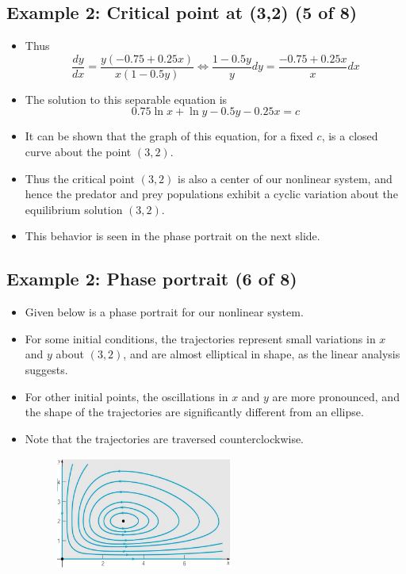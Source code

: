\documentclass[11pt,a4paper]{article}
\begin{document}
	\subsection*{Example 2: Critical point at (3,2) (5 of 8)}
	\begin{itemize}
		\item Thus
		$$
		\frac{dy}{dx} = \frac{y(-0.75 + 0.25x)}{x(1-0.5y)} \Leftrightarrow \frac{1-0.5y}{y}dy = \frac{-0.75 + 0.25x}{x}dx
		$$
		\item The solution to this separable equation is
		$$
		0.75\ln x + \ln y - 0.5y - 0.25x = c
		$$
		\item It can be shown that the graph of this equation, for a fixed $c$, is a closed curve about the point $(3,2)$.
		\item Thus the critical point $(3,2)$ is also a center of our nonlinear system, and hence the predator and prey populations exhibit a cyclic variation about the equilibrium solution $(3,2)$.
		\item This behavior is seen in the phase portrait on the next slide.
	\end{itemize}
	\subsection*{Example 2: Phase portrait (6 of 8)}
	\begin{itemize}
		\item Given below is a phase portrait for our nonlinear system.
		\item For some initial conditions, the trajectories represent small variations in $x$ and $y$ about $(3,2)$, and are almost elliptical in shape, as the linear analysis suggests.
		\item For other initial points, the oscillations in $x$ and $y$ are more pronounced, and the shape of the trajectories are significantly different from an ellipse.
		\item Note that the trajectories are traversed counterclockwise.
		\begin{figure}[H]
			\centering
			\includegraphics[width=0.55\textwidth]{figure/Lec17f6.PNG}
		\end{figure}
	\end{itemize}
\end{document}
